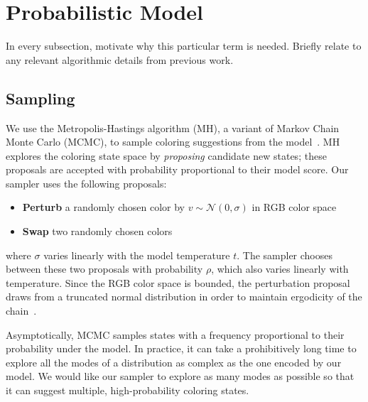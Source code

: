 \section{Probabilistic Model}
\label{sec:model}




In every subsection, motivate why this particular term is needed. Briefly relate to any relevant algorithmic details from previous work.



\subsection{Sampling}
\label{sec:sampling}

We use the Metropolis-Hastings algorithm (MH), a variant of Markov Chain Monte Carlo (MCMC), to sample coloring suggestions from the model~\cite{Metropolis,Hastings}. MH explores the coloring state space by \emph{proposing} candidate new states; these proposals are accepted with probability proportional to their model score. Our sampler uses the following proposals:
\begin{itemize}
	\item{\textbf{Perturb} a randomly chosen color by $v \sim \mathcal{N}(0, \sigma)$ in RGB color space}
	\item{\textbf{Swap} two randomly chosen colors}
\end{itemize}
where $\sigma$ varies linearly with the model temperature $t$. The sampler chooses between these two proposals with probability $\rho$, which also varies linearly with temperature. Since the RGB color space is bounded, the perturbation proposal draws from a truncated normal distribution in order to maintain ergodicity of the chain~\cite{TruncatedGaussians}.

Asymptotically, MCMC samples states with a frequency proportional to their probability under the model. In practice, it can take a prohibitively long time to explore all the modes of a distribution as complex as the one encoded by our model. We would like our sampler to explore as many modes as possible so that it can suggest multiple, high-probability coloring states.

